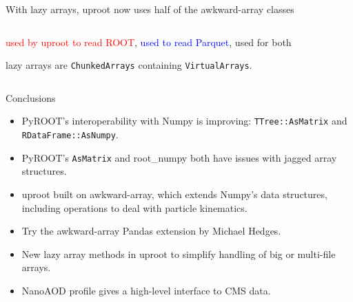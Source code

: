 \documentclass[aspectratio=169]{beamer}
\begin{document}
\begin{frame}{With lazy arrays, uproot now uses half of the awkward-array classes}
\begin{columns}
\vspace{-0.25 cm}
\begin{center}
\begin{minipage}{0.63\linewidth}
\small
\textcolor{red}{used by uproot to read ROOT}, \textcolor{blue}{used to read Parquet}, \textcolor{mauve}{used for both}

lazy arrays are \texttt{ChunkedArrays} containing \texttt{VirtualArrays}.
\end{minipage}
\end{center}
\end{columns}
\end{frame}

\begin{frame}{Conclusions}
\Large
\vspace{0.25 cm}

\begin{itemize}\setlength{\itemsep}{0.2 cm}
\item PyROOT's interoperability with Numpy is improving: \texttt{TTree::AsMatrix} and \texttt{RDataFrame::AsNumpy}.
\item PyROOT's \texttt{AsMatrix} and root\_numpy both have issues with jagged array structures.
\item uproot built on awkward-array, which extends Numpy's data structures, including operations to deal with particle kinematics.
\item Try the awkward-array Pandas extension by Michael Hedges.
\item New lazy array methods in uproot to simplify handling of big or multi-file arrays.
\item NanoAOD profile gives a high-level interface to CMS data.
\end{itemize}
\end{frame}
\end{document}
